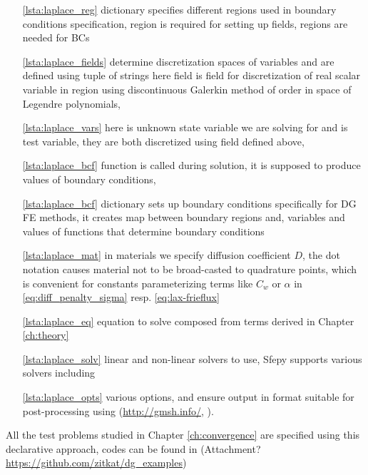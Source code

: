 \begin{itemize}
	\item[\ref{lsta:laplace_reg}]  dictionary specifies different 
	regions 
	used in	boundary conditions specification,  region is required for 
	setting up fields,  regions are needed for BCs
	\item[\ref{lsta:laplace_fields}]   determine discretization spaces of 
	variables and are defined using tuple of strings
	 here field  is field for discretization of real scalar 
	variable in region  using discontinuous Galerkin method of order 
	 in space of Legendre polynomials, 
	\item[\ref{lsta:laplace_vars}]  here  is unknown state variable we are 
	solving for and  is test variable, they are both discretized using field 
	 defined above,
	\item[\ref{lsta:laplace_bcf}]  function  is called during solution, it 
	is supposed to produce values of boundary conditions,
	\item[\ref{lsta:laplace_bcf}]  dictionary sets up boundary 
	conditions specifically for DG FE methods, it creates map between boundary regions 
	and, variables and values of functions that determine boundary conditions
	\item[\ref{lsta:laplace_mat}] in materials we specify diffusion 
	coefficient $D$, the dot notation  
	causes material not to be broad-casted to quadrature points, which is convenient for 
	constants parameterizing terms like $C_w$ or $\alpha$ in 
	\eqref{eq:diff_penalty_sigma} 
	resp. \eqref{eq:lax-frieflux}
	\item[\ref{lsta:laplace_eq}] equation to solve composed from terms derived in 
	Chapter \ref{ch:theory}
	
	\item[\ref{lsta:laplace_solv}] linear and non-linear solvers to use, Sfepy supports 
	various solvers including  \cite{MUMPS:2}
	
	\item[\ref{lsta:laplace_opts}] various options,  and 
	 ensure output in format suitable for 
	post-processing using  (\url{http://gmsh.info/}, \cite{Remacle2007}).
\end{itemize}
All the test problems studied in Chapter \ref{ch:convergence} are specified using this 
declarative approach, codes can be found in (\todo Attachment? 
\url{https://github.com/zitkat/dg_examples})

